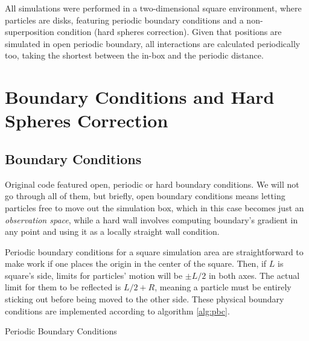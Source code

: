 \documentclass[../../master_thesis_np.tex]{subfiles}
\begin{document}
	All simulations were performed in a two-dimensional square environment, where particles are disks, featuring periodic boundary conditions and a non-superposition condition (hard spheres correction). 
	Given that positions are simulated in open periodic boundary, all interactions are calculated periodically too, taking the shortest between the in-box and the periodic distance.
	
	\section{Boundary Conditions and Hard Spheres Correction}
	\subsection{Boundary Conditions}
	Original code featured open, periodic or hard boundary conditions. 
	We will not go through all of them, but briefly, open boundary conditions means letting particles free to move out the simulation box, which in this case becomes just an \emph{observation space}, while a hard wall involves computing boundary's gradient in any point and using it as a locally straight wall condition.
	
	Periodic boundary conditions for a square simulation area are straightforward to make work if one places the origin in the center of the square. 
	Then, if $L$ is square's side, limits for particles' motion will be $\pm L/2$ in both axes. 
	The actual limit for them to be reflected is $L/2 + R$, meaning a particle must be entirely sticking out before being moved to the other side. %
	These physical boundary conditions are implemented according to algorithm \ref{alg:pbc}.
	
	\begin{algorithm}[htp]
		\caption{Periodic Boundary Conditions} \label{alg:pbc}	
		\begin{algorithmic}[1]
			\EndIf
			\EndIf
			\EndFor
		\end{algorithmic}
	\end{algorithm}
	
\end{document}

